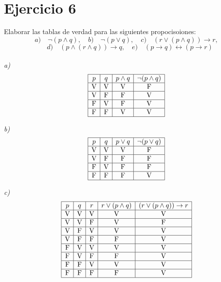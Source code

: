 \chapter*{Ejercicio 6}

Elaborar las tablas de verdad para las siguientes propocisoiones:
\[
a) \quad \neg (p \land q), \quad b)\quad \neg (p \lor q),\quad c) \quad (r \lor ( p \land q)) \to r,\] 
\[\quad d) \quad (p \land ( r \land q) ) \to  q, \quad e) \quad (p \to q) \leftrightarrow ( p \to r)
\] \\

\textit{a) }
\[
\begin{array}{|c|c|c|c|c|}
\hline
p & q & p \land q & \neg (p \land q) \\
\hline
\text{V} & \text{V} & \text{V} & \text{F} \\
\hline
\text{V} & \text{F} & \text{F} & \text{V} \\
\hline
\text{F} & \text{V} & \text{F} & \text{V} \\
\hline
\text{F} & \text{F} & \text{V} & \text{V} \\
\hline
\end{array}
\]  


\textit{b) }
\[
\begin{array}{|c|c|c|c|}
\hline
p & q & p \lor q & \neg (p \lor q) \\
\hline
\text{V} & \text{V} & \text{V} & \text{F} \\
\hline
\text{V} & \text{F} & \text{F} & \text{F} \\
\hline
\text{F} & \text{V} & \text{F} & \text{F} \\
\hline
\text{F} & \text{F} & \text{F} & \text{V} \\
\hline
\end{array}
\]

\textit{c) }
\[
\begin{array}{|c|c|c|c|c|}
\hline
p & q & r & r \lor (p \land q) & (r \lor (p \land q)) \rightarrow r \\
\hline
\text{V} & \text{V} & \text{V} & \text{V} & \text{V} \\
\hline
\text{V} & \text{V} & \text{F} & \text{V} & \text{F} \\
\hline
\text{V} & \text{F} & \text{V} & \text{V} & \text{V} \\
\hline
\text{V} & \text{F} & \text{F} & \text{F} & \text{V} \\
\hline
\text{F} & \text{V} & \text{V} & \text{V} & \text{V} \\
\hline
\text{F} & \text{V} & \text{F} & \text{F} & \text{V} \\
\hline
\text{F} & \text{F} & \text{V} & \text{V} & \text{V} \\
\hline
\text{F} & \text{F} & \text{F} & \text{F} & \text{V} \\
\hline
\end{array}
\]

